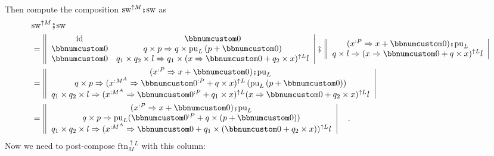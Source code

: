 Then compute the composition $\text{sw}^{\uparrow M}\bef\text{sw}$
as
\begin{align*}
 & \text{sw}^{\uparrow M}\bef\text{sw}\\
 & =\left\Vert \begin{array}{cc}
\text{id} & \bbnum 0\\
\bbnum 0 & q\times p\Rightarrow q\times\text{pu}_{L}\left(p+\bbnum 0\right)\\
\bbnum 0 & q_{1}\times q_{2}\times l\Rightarrow q_{1}\times(x\Rightarrow\bbnum 0+q_{2}\times x)^{\uparrow L}l
\end{array}\right|\bef\left\Vert \begin{array}{c}
(x^{:P}\Rightarrow x+\bbnum 0)\bef\text{pu}_{L}\\
q\times l\Rightarrow(x\Rightarrow\bbnum 0+q\times x)^{\uparrow L}l
\end{array}\right|\\
 & =\left\Vert \begin{array}{c}
(x^{:P}\Rightarrow x+\bbnum 0)\bef\text{pu}_{L}\\
q\times p\Rightarrow(x^{:M^{A}}\Rightarrow\bbnum 0^{:P}+q\times x)^{\uparrow L}\left(\text{pu}_{L}\left(p+\bbnum 0\right)\right)\\
q_{1}\times q_{2}\times l\Rightarrow(x^{:M^{A}}\Rightarrow\bbnum 0^{:P}+q_{1}\times x)^{\uparrow L}(x\Rightarrow\bbnum 0+q_{2}\times x)^{\uparrow L}l
\end{array}\right|\\
 & =\left\Vert \begin{array}{c}
(x^{:P}\Rightarrow x+\bbnum 0)\bef\text{pu}_{L}\\
q\times p\Rightarrow\text{pu}_{L}(\bbnum 0^{:P}+q\times\left(p+\bbnum 0\right))\\
q_{1}\times q_{2}\times l\Rightarrow(x^{:M^{A}}\Rightarrow\bbnum 0+q_{1}\times(\bbnum 0+q_{2}\times x))^{\uparrow L}l
\end{array}\right|\quad.
\end{align*}
Now we need to post-compose $\text{ftn}_{M}^{\uparrow L}$ with this
column:

